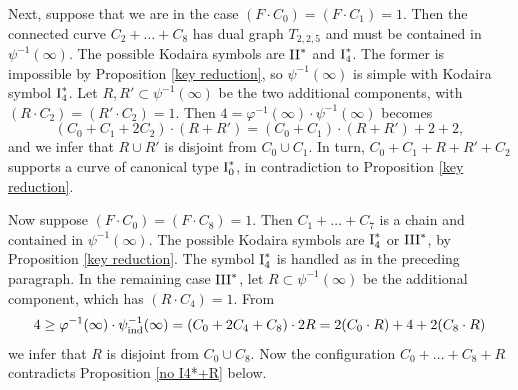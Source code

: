 \documentclass[oneside, 12pt]{amsart}
\theoremstyle{definition}
\theoremstyle{remark}
\newcommand{\I}{\text{\rm I}}
\newcommand{\II}{\text{\rm II}}
\newcommand{\III}{\text{\rm III}}
\newcommand{\ind}{\text{\rm ind}}
\newcommand{\inv}{{-1}}
\begin{document}
Next, suppose that we are in the case $(F\cdot C_0)=(F\cdot C_1)=1$. Then the connected curve $C_2+\ldots+C_8$
has dual graph $T_{2,2,5}$  and must be contained in $\psi^{-1}(\infty)$.
The possible Kodaira symbols are $\II^*$ and $\I_4^*$. 
The former is impossible by Proposition \ref{key reduction}, so $\psi^\inv(\infty)$ is simple with Kodaira symbol $\I_4^*$.   
Let $R,R'\subset\psi^{-1}(\infty)$ be the two additional components,
with $(R\cdot C_2)=(R'\cdot C_2)=1$. Then $4=\varphi^{-1}(\infty)\cdot \psi^{-1}(\infty)$ becomes
$$
(C_0+C_1+2C_2)\cdot (R+R') = (C_0+C_1)\cdot (R+R') + 2+2, 
$$
and we infer that $R\cup R'$ is disjoint from $C_0\cup C_1$. In turn, $C_0+C_1+R+R'+C_2$ supports a curve of canonical type
$\I_0^*$, in  contradiction to Proposition \ref{key reduction}.

Now suppose $(F\cdot C_0)=(F\cdot C_8)=1$. Then $C_1+\ldots +C_7$ is a chain and contained in $\psi^{-1}(\infty)$.
The possible Kodaira symbols are $\I_4^*$ or $\III^*$, by Proposition \ref{key reduction}. 
The symbol $\I_4^*$ is handled as in the preceding paragraph. In the remaining case $\III^*$, let $R\subset \psi^{-1}(\infty)$ be the
additional component, which has $(R\cdot C_4)=1$. From
$$
4\geq \varphi^{-1}(\infty)\cdot \psi^{-1}_\ind(\infty) = (C_0+2C_4+C_8)\cdot 2R = 2(C_0\cdot R) + 4 + 2(C_8\cdot R)
$$
we infer that $R$ is disjoint from $C_0\cup C_8$. Now the configuration $C_0+\ldots+C_8+R$ contradicts Proposition \ref{no I4*+R} below.
\end{document}
